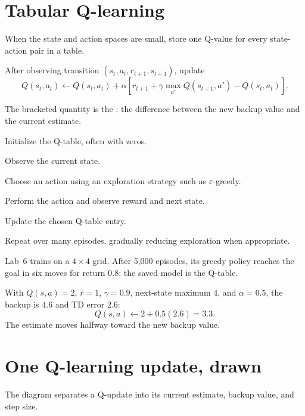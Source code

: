 \section{Tabular Q-learning}

When the state and action spaces are small, store one Q-value for every state-action pair in a table.

After observing transition $(s_t,a_t,r_{t+1},s_{t+1})$, update
\[
Q(s_t,a_t)\leftarrow Q(s_t,a_t)+\alpha\left[r_{t+1}+\gamma\max_{a'}Q(s_{t+1},a')-Q(s_t,a_t)\right].
\]

The bracketed quantity is the : the difference between the new backup value and the current estimate.

\begin{mlsteps}
  \item Initialize the Q-table, often with zeros.
  \item Observe the current state.
  \item Choose an action using an exploration strategy such as $\varepsilon$-greedy.
  \item Perform the action and observe reward and next state.
  \item Update the chosen Q-table entry.
  \item Repeat over many episodes, gradually reducing exploration when appropriate.
\end{mlsteps}

Lab~6 trains on a $4\times4$ grid. After 5,000 episodes, its greedy policy reaches the goal in six moves for return $0.8$; the saved model is the Q-table.

\begin{workedexample}
With $Q(s,a)=2$, $r=1$, $\gamma=0.9$, next-state maximum 4, and $\alpha=0.5$, the backup is $4.6$ and TD error $2.6$:
\[
Q(s,a)\leftarrow2+0.5(2.6)=3.3.
\]
The estimate moves halfway toward the new backup value.
\end{workedexample}

\section{One Q-learning update, drawn}

The diagram separates a Q-update into its current estimate, backup value, and step size.

